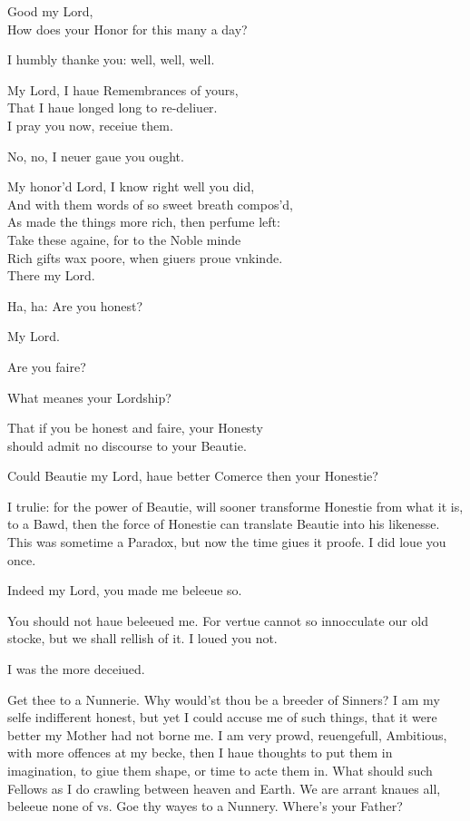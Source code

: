 \documentclass[a5paper,DIV=calc,11pt]{scrbook}
\begin{document}
\begin{drama*}
    \ophespeaks Good my Lord,\\
    How does your Honor for this many a day?
    
    \hamspeaks I humbly thanke you: well, well, well.
    
    \ophespeaks My Lord, I haue Remembrances of yours,\\
    That I haue longed long to re-deliuer.\\
    I pray you now, receiue them.
    
    \hamspeaks No, no, I neuer gaue you ought.
    
    \ophespeaks My honor'd Lord, I know right well you did,\\
    And with them words of so sweet breath compos'd,\\
    As made the things more rich, then perfume left:\\
    Take these againe, for to the Noble minde\\
    Rich gifts wax poore, when giuers proue vnkinde.\\
    There my Lord.
    
    \hamspeaks Ha, ha: Are you honest?
    
    \ophespeaks My Lord.
    
    \hamspeaks Are you faire?
    
    \ophespeaks What meanes your Lordship?
    
    \hamspeaks That if you be honest and faire, your Honesty\\
    should admit no discourse to your Beautie.
    
    \ophespeaks Could Beautie my Lord, haue better Comerce then your Honestie?
    
    \hamspeaks I trulie: for the power of Beautie, will sooner transforme Honestie from what it is, to a Bawd, then the force of Honestie can translate Beautie into his likenesse. This was sometime a Paradox, but now the time giues it proofe. I did loue you once.
    
    \ophespeaks Indeed my Lord, you made me beleeue so.
    
    \hamspeaks You should not haue beleeued me. For vertue cannot so innocculate our old stocke, but we shall rellish of it. I loued you not.
    
    \ophespeaks I was the more deceiued.
    
    \hamspeaks Get thee to a Nunnerie. Why would'st thou be a breeder of Sinners? I am my selfe indifferent honest, but yet I could accuse me of such things, that it were better my Mother had not borne me. I am very prowd, reuengefull, Ambitious, with more offences at my becke, then I haue thoughts to put them in imagination, to giue them shape, or time to acte them in. What should such Fellows as I do crawling between heaven and Earth. We are arrant knaues all, beleeue none of vs. Goe thy wayes to a Nunnery. Where's your Father?
    

\end{drama*}
\end{document}

